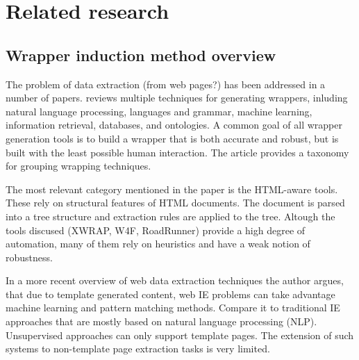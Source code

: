 \chapter{Related research}





\section{Wrapper induction method overview}

The problem of data extraction (from web pages?) has been addressed in a number of papers. \cite{Laender:2002:BSW:565117.565137} reviews multiple techniques for generating wrappers, inluding natural language processing, languages and grammar, machine learning, information retrieval, databases, and ontologies. A common goal of all wrapper generation tools is to build a wrapper that is both accurate and robust, but is built with the least possible human interaction. The article provides a taxonomy for grouping wrapping techniques.

The most relevant category mentioned in the paper is the HTML-aware tools. These rely on structural features of HTML documents. The document is parsed into a tree structure and extraction rules are applied to the tree. Altough the tools discused (XWRAP, W4F, RoadRunner) provide a high degree of automation, many of them rely on heuristics and have a weak notion of robustness.

In a more recent overview of web data extraction techniques \cite{Chang:2006:SWI:1159162.1159300} the author argues, that due to template generated content, web IE problems can take advantage machine learning and pattern matching methods. Compare it to traditional IE approaches that are mostly based on natural language processing (NLP). Unsupervised approaches can only support template pages. The extension of such systems to non-template page extraction tasks is very limited.

